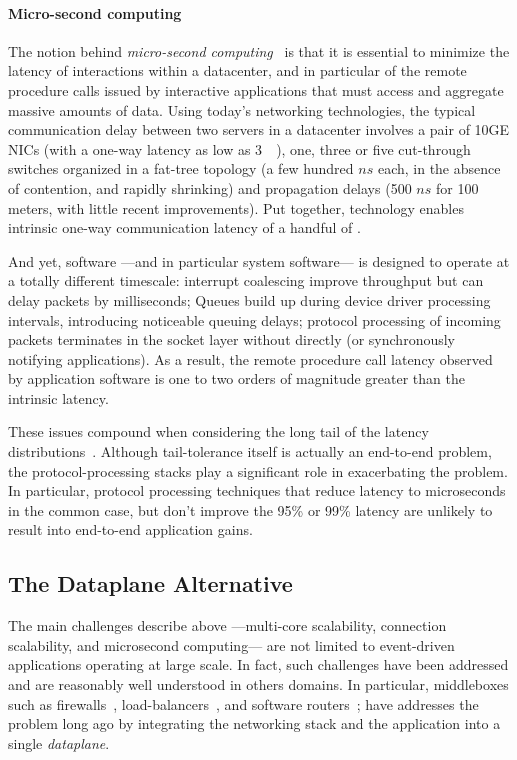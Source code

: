 \paragraph{Micro-second computing}

The notion behind \emph{micro-second computing}~\cite{luiz-isscc} is
that it is essential to minimize the latency of interactions within a
datacenter, and in particular of the remote procedure calls issued by
interactive applications that must access and aggregate massive
amounts of data.  Using today's networking technologies, the typical
communication delay between two servers in a datacenter involves a
pair of 10GE NICs (with a one-way latency as low as
3~\microsecond~\cite{cisco-sereno}), one, three or five cut-through
switches organized in a fat-tree topology (a few hundred $ns$ each, in
the absence of contention, and rapidly shrinking) and propagation
delays (500 $ns$ for 100 meters, with little recent improvements).
Put together, technology enables intrinsic one-way communication
latency of a handful of \microsecond.  

And yet, software ---and in particular system software--- is designed
to operate at a totally different timescale: interrupt coalescing
improve throughput but can delay packets by milliseconds; Queues build
up during device driver processing intervals, introducing noticeable
queuing delays; protocol processing of incoming packets terminates in
the socket layer without directly (or synchronously notifying
applications).  As a result, the remote procedure call latency
observed by application software is one to two orders of magnitude
greater than the intrinsic latency.

These issues compound when considering the long tail of the latency
distributions~\cite{DBLP:journals/cacm/DeanB13}. Although
tail-tolerance itself is actually an end-to-end problem, the
protocol-processing stacks play a significant role in exacerbating the
problem.  In particular, protocol processing techniques that reduce
latency to microseconds in the common case, but don't improve the 95\%
or 99\% latency are unlikely to result into end-to-end application
gains.

\subsection{The Dataplane Alternative}
\label{sec:motivation:dp}

The main challenges describe above ---multi-core scalability,
connection scalability, and microsecond computing--- are not limited
to event-driven applications operating at large scale.  In fact, such
challenges have been addressed and are reasonably well understood in
others domains.  In particular, middleboxes such as
firewalls~\cite{missing}, load-balancers~\cite{missing}, and software
routers~\cite{DBLP:journals/tocs/KohlerMCJK00,DBLP:conf/sosp/DobrescuEACFIKMR09};
have addresses the problem long ago by integrating the networking
stack and the application into a single \emph{dataplane}.

